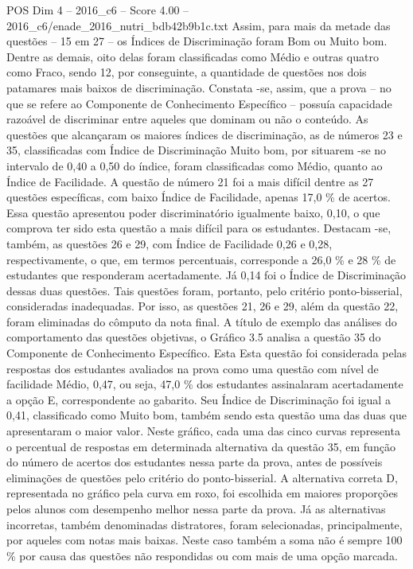 \begin{textsample}{POS Dim 4 – 2016\_c6 – Score 4.00 – 2016\_c6/enade\_2016\_nutri\_bdb42b9b1c.txt}
Assim, para mais da metade das questões – 15 em 27 – os Índices de Discriminação foram Bom ou Muito bom.
Dentre as demais, oito delas foram classificadas como Médio e outras quatro como Fraco, sendo 12, por conseguinte, a quantidade de questões nos dois patamares mais baixos de discriminação.
Constata -se, assim, que a prova – no que se refere ao Componente de Conhecimento Específico – possuía capacidade razoável de discriminar entre aqueles que dominam ou não o conteúdo.
As questões que alcançaram os maiores índices de discriminação, as de números 23 e 35, classificadas com Índice de Discriminação Muito bom, por situarem -se no intervalo de 0,40 a 0,50 do índice, foram classificadas como Médio, quanto ao Índice de Facilidade.
A questão de número 21 foi a mais difícil dentre as 27 questões específicas, com baixo Índice de Facilidade, apenas 17,0 \% de acertos.
Essa questão apresentou poder discriminatório igualmente baixo, 0,10, o que comprova ter sido esta questão a mais difícil para os estudantes.
Destacam -se, também, as questões 26 e 29, com Índice de Facilidade 0,26 e 0,28, respectivamente, o que, em termos percentuais, corresponde a 26,0 \% e 28 \% de estudantes que responderam acertadamente.
Já 0,14 foi o Índice de Discriminação dessas duas questões.
Tais questões foram, portanto, pelo critério ponto-bisserial, consideradas inadequadas.
Por isso, as questões 21, 26 e 29, além da questão 22, foram eliminadas do cômputo da nota final.
A título de exemplo das análises do comportamento das questões objetivas, o Gráfico 3.5 analisa a questão 35 do Componente de Conhecimento Específico.
Esta Esta questão foi considerada pelas respostas dos estudantes avaliados na prova como uma questão com nível de facilidade Médio, 0,47, ou seja, 47,0 \% dos estudantes assinalaram acertadamente a opção E, correspondente ao gabarito.
Seu Índice de Discriminação foi igual a 0,41, classificado como Muito bom, também sendo esta questão uma das duas que apresentaram o maior valor.
Neste gráfico, cada uma das cinco curvas representa o percentual de respostas em determinada alternativa da questão 35, em função do número de acertos dos estudantes nessa parte da prova, antes de possíveis eliminações de questões pelo critério do ponto-bisserial.
A alternativa correta D, representada no gráfico pela curva em roxo, foi escolhida em maiores proporções pelos alunos com desempenho melhor nessa parte da prova.
Já as alternativas incorretas, também denominadas distratores, foram selecionadas, principalmente, por aqueles com notas mais baixas.
Neste caso também a soma não é sempre 100 \% por causa das questões não respondidas ou com mais de uma opção marcada.

\end{textsample}
